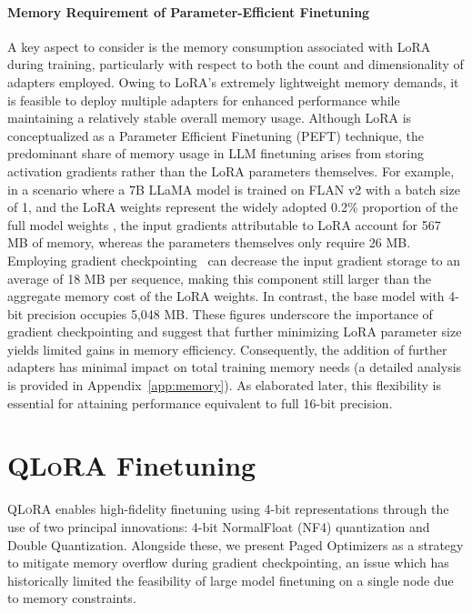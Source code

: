 \paragraph{Memory Requirement of Parameter-Efficient Finetuning} A key aspect to consider is the memory consumption associated with LoRA during training, particularly with respect to both the count and dimensionality of adapters employed. Owing to LoRA’s extremely lightweight memory demands, it is feasible to deploy multiple adapters for enhanced performance while maintaining a relatively stable overall memory usage. Although LoRA is conceptualized as a Parameter Efficient Finetuning (PEFT) technique, the predominant share of memory usage in LLM finetuning arises from storing activation gradients rather than the LoRA parameters themselves. For example, in a scenario where a 7B LLaMA model is trained on FLAN v2 with a batch size of 1, and the LoRA weights represent the widely adopted 0.2\% proportion of the full model weights \citep{hu2021lora,liu2022few}, the input gradients attributable to LoRA account for 567 MB of memory, whereas the parameters themselves only require 26 MB. Employing gradient checkpointing~\citep{chen2016training} can decrease the input gradient storage to an average of 18 MB per sequence, making this component still larger than the aggregate memory cost of the LoRA weights. In contrast, the base model with 4-bit precision occupies 5,048 MB. These figures underscore the importance of gradient checkpointing and suggest that further minimizing LoRA parameter size yields limited gains in memory efficiency. Consequently, the addition of further adapters has minimal impact on total training memory needs (a detailed analysis is provided in Appendix~\ref{app:memory}). As elaborated later, this flexibility is essential for attaining performance equivalent to full 16-bit precision.

\section{\textsc{QLoRA} Finetuning}

\textsc{QLoRA} enables high-fidelity finetuning using 4-bit representations through the use of two principal innovations: 4-bit NormalFloat (NF4) quantization and Double Quantization. Alongside these, we present Paged Optimizers as a strategy to mitigate memory overflow during gradient checkpointing, an issue which has historically limited the feasibility of large model finetuning on a single node due to memory constraints.

